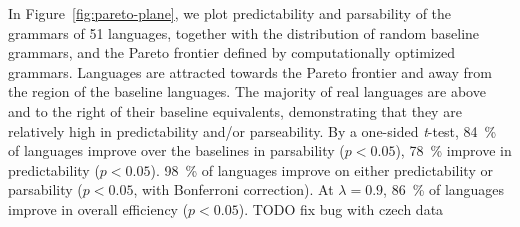 \documentclass[9pt,twocolumn,twoside,lineno]{pnas-new}
\begin{document}
In Figure~\ref{fig:pareto-plane}, we plot predictability and parsability of the grammars of 51 languages, together with the distribution of random baseline grammars, and the Pareto frontier defined by computationally optimized grammars.
Languages are attracted towards the Pareto frontier and away from the region of the baseline languages.
The majority of real languages are above and to the right of their baseline equivalents, demonstrating that they are relatively high in predictability and/or parseability.
By a one-sided \textit{t}-test, 84~\% of languages improve over the baselines in parsability ($p < 0.05$), 78~\% improve in predictability ($p < 0.05$).
98~\% of languages improve on either predictability or parsability ($p<0.05$, with Bonferroni correction).
At $\lambda = 0.9$, 86~\% of languages improve in overall efficiency ($p<0.05$).
TODO fix bug with czech data




\end{document}

